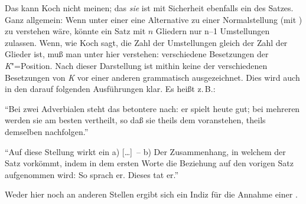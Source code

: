 \documentclass[output=paper]{langsci/langscibook}
\begin{document}
Das kann Koch nicht meinen; das  \textit{sie} ist mit Sicherheit
ebenfalls ein  des Satzes. Ganz allgemein: Wenn unter einer
 eine Alternative zu einer Normalstellung (mit
) zu verstehen wäre, könnte ein Satz mit $n$ Gliedern
nur n–1 Umstellungen zulassen. Wenn, wie Koch sagt, die Zahl der
Umstellungen gleich der Zahl der Glieder ist, muß man unter
 hier verstehen: verschiedene Besetzungen der
\textit{K}"=Position. Nach dieser Darstellung ist mithin keine der verschiedenen
Besetzungen von \textit{K} vor einer anderen grammatisch ausgezeichnet.  Dies
wird auch in den darauf folgenden Ausführungen klar. Es heißt z.\,B.:
\begin{exe}
\ex\label{ex:1-5-15}
"`Bei zwei Adverbialen steht das betontere nach: {\small er spielt heute gut}; bei mehreren werden sie am besten vertheilt, so daß sie theils dem  voranstehen, theils demselben nachfolgen."' \citep[220, §435c]{Koch1860}

"`Auf diese Stellung wirkt ein a) [\ldots]~– b) Der Zusammenhang, in welchem
der Satz vorkömmt, indem in dem ersten Worte die Beziehung auf den vorigen Satz aufgenommen wird: So sprach er. Dieses tat er."' \citep[220, §436]{Koch1860}
\end{exe}
Weder hier noch an anderen Stellen ergibt sich ein Indiz für die Annahme einer .
\end{document}
